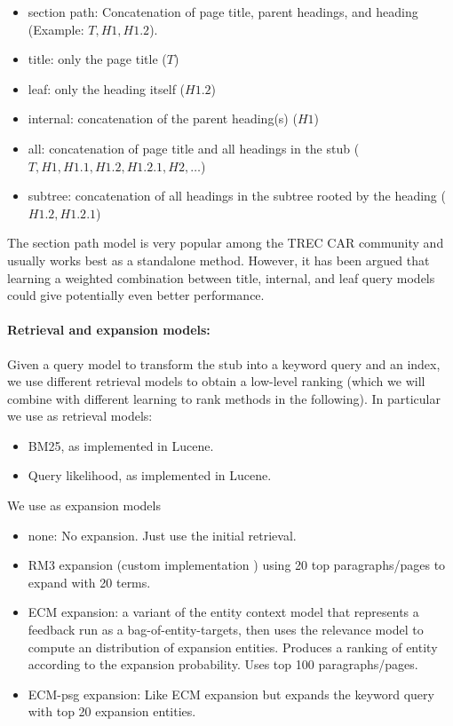 \documentclass{article}
\begin{document}
\begin{itemize}
    \item section path: Concatenation of page title, parent headings, and heading (Example: $T,H1,H1.2$).
    \item title: only the page title ($T$)
    \item leaf: only the heading itself ($H1.2$)
    \item internal: concatenation of the parent heading(s) ($H1$)
    \item all: concatenation of page title and all headings in the stub ($T,H1,H1.1,H1.2, H1.2.1,H2,\dots$)
    \item subtree: concatenation of all headings in the subtree rooted by the heading ($H1.2, H1.2.1$)
\end{itemize}

The section path model is very popular among the TREC CAR community and usually works best as a standalone method. However, it has been argued that learning a weighted combination between title, internal, and leaf query models could give potentially even better performance.


\paragraph{Retrieval and expansion models:}

Given a query model to transform the stub into a keyword query and an index, we  use different retrieval models to obtain a low-level ranking (which we will combine with different learning to rank methods in the following). In particular we use as retrieval models:

\begin{itemize}
    \item BM25, as implemented in Lucene.
    \item Query likelihood, as implemented in Lucene.
\end{itemize}

We use as expansion models    
\begin{itemize}
    \item none: No expansion. Just use the initial retrieval.
    \item RM3 expansion (custom implementation \cite{lavrenko2017relevance}) using 20 top paragraphs/pages to expand with 20 terms.
    \item ECM expansion: a variant of the entity context model \cite{dalton2014entity} that represents a feedback run as a bag-of-entity-targets, then uses the relevance model to compute an distribution of expansion entities. Produces a ranking of entity according to the expansion probability. Uses top 100 paragraphs/pages.
    \item ECM-psg expansion: Like ECM expansion but expands the keyword query with top 20 expansion entities.
\end{itemize}
\end{document}
